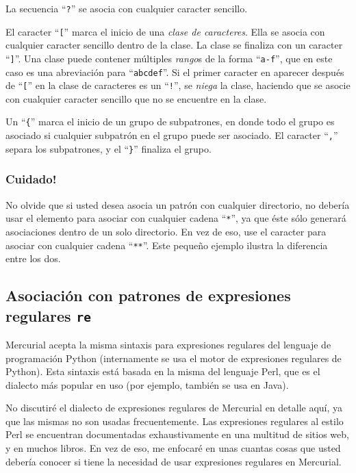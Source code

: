La secuencia ``\texttt{?}'' se asocia con cualquier caracter sencillo.

El caracter ``\texttt{[}'' marca el inicio de una \emph{clase de
caracteres}.  Ella se asocia con cualquier caracter sencillo dentro de
la clase. La clase se finaliza con un caracter ``\texttt{]}''. Una
clase puede contener múltiples \emph{rango}s de la forma
``\texttt{a-f}'', que en este caso es una abreviación para
``\texttt{abcdef}''.
Si el primer caracter en aparecer después de ``\texttt{[}'' en la
clase de caracteres es un ``\texttt{!}'', se \emph{niega} la clase,
haciendo que se asocie con cualquier caracter sencillo que no se
encuentre en la clase.

Un ``\texttt{\{}'' marca el inicio de un grupo de subpatrones, en
donde todo el grupo es asociado si cualquier subpatrón en el grupo
puede ser asociado. El caracter ``\texttt{,}'' separa los subpatrones,
y el ``\texttt{\}}'' finaliza el grupo.

\subsubsection{Cuidado!}

No olvide que si usted desea asocia un patrón con cualquier
directorio, no debería usar el elemento para asociar con cualquier
cadena ``\texttt{*}'', ya que éste sólo generará asociaciones dentro
de un solo directorio. En vez de eso, use el caracter para asociar con
cualquier cadena ``\texttt{**}''. Este pequeño ejemplo ilustra la
diferencia entre los dos.

\subsection{Asociación con patrones de expresiones regulares \texttt{re}}

Mercurial acepta la misma sintaxis para expresiones regulares del
lenguaje de programación Python (internamente se usa el motor de
expresiones regulares de Python). Esta sintaxis está basada en la
misma del lenguaje Perl, que es el dialecto más popular en uso
(por ejemplo, también se usa en Java).

No discutiré el dialecto de expresiones regulares de Mercurial en
detalle aquí, ya que las mismas no son usadas frecuentemente. Las
expresiones regulares al estilo Perl se encuentran documentadas
exhaustivamente en una multitud de sitios web, y en muchos libros.
En vez de eso, me enfocaré en unas cuantas cosas que usted debería
conocer si tiene la necesidad de usar expresiones regulares en
Mercurial.

